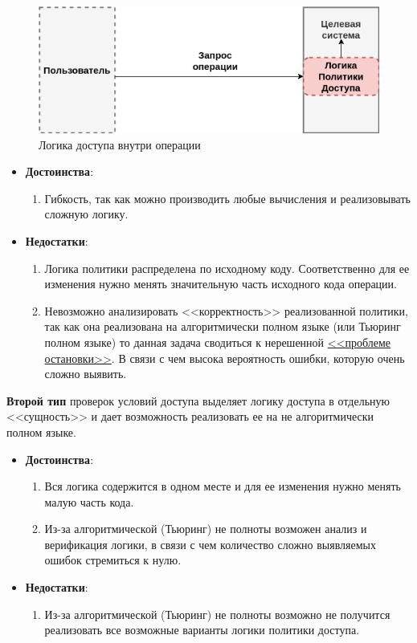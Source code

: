 \begin{figure}[H]
	\centering
	\includegraphics[scale = 0.7]{25/AC_in.png}
	\caption{Логика доступа внутри операции}
	\label{fig:ac_in}
\end{figure}


\begin{itemize}
	\item \textbf{Достоинства}:
	\begin{enumerate}
		\item Гибкость, так как можно производить любые вычисления и реализовывать сложную логику.
	\end{enumerate}
	\item \textbf{Недостатки}:
	\begin{enumerate}
		\item Логика политики распределена по исходному коду. Соответственно для ее изменения нужно менять значительную часть исходного кода операции.
		\item Невозможно анализировать <<корректность>> реализованной политики, так как она реализована на алгоритмически полном языке (или Тьюринг полном языке) то данная задача сводиться к нерешенной \href{https://clck.ru/pui5M}{<<проблеме остановки>>}. В связи с чем высока вероятность ошибки, которую очень сложно выявить.
	\end{enumerate}
\end{itemize}


\textbf{Второй тип} проверок условий доступа выделяет логику доступа в отдельную <<сущность>> и дает возможность реализовать ее на не алгоритмически полном языке.
\begin{itemize}
	\item \textbf{Достоинства}:
	\begin{enumerate}
		\item Вся логика содержится в одном месте и для ее изменения нужно менять малую часть кода.
		\item Из-за алгоритмической (Тьюринг) не полноты возможен анализ и верификация логики, в связи с чем количество сложно выявляемых ошибок стремиться к нулю.
	\end{enumerate}
	\item \textbf{Недостатки}:
	\begin{enumerate}
		\item Из-за алгоритмической (Тьюринг) не полноты возможно не получится реализовать все возможные варианты логики политики доступа.
	\end{enumerate}
\end{itemize}

